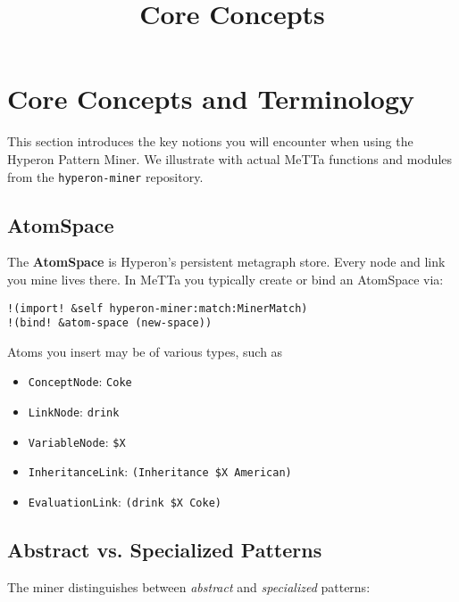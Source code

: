 \documentclass{article}
\title{Core Concepts}
\begin{document}
\section{Core Concepts and Terminology}

This section introduces the key notions you will encounter when using the Hyperon Pattern Miner.  We illustrate with actual MeTTa functions and modules from the \texttt{hyperon-miner} repository.

\subsection{AtomSpace}

The \textbf{AtomSpace} is Hyperon's persistent metagraph store.  Every node and link you mine lives there.  In MeTTa you typically create or bind an AtomSpace via:

\begin{verbatim}
!(import! &self hyperon-miner:match:MinerMatch)
!(bind! &atom-space (new-space)) 
\end{verbatim}

Atoms you insert may be of various types, such as

\begin{itemize}
  \item \texttt{ConceptNode}: \verb|Coke|
  \item \texttt{LinkNode}: \verb|drink|
  \item \texttt{VariableNode}:  \verb|$X|
  \item \texttt{InheritanceLink}: 
    \verb|(Inheritance $X American)|
  \item \texttt{EvaluationLink}:  
    \verb|(drink $X Coke)|
\end{itemize}

\subsection{Abstract vs. Specialized Patterns}

The miner distinguishes between \emph{abstract} and \emph{specialized} patterns:
\end{document}
